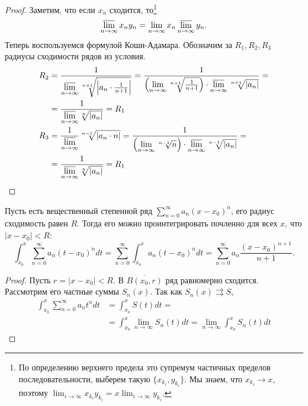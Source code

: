 \begin{proof}
	Заметим, что если $ x_{n}$ сходится, то\footnote{По определению верхнего предела это супремум частичных пределов последовательности, выберем такую $ \{x_{k_{i}}, y_{k_{i}}\}$. Мы знаем, что $ x_{k_{i}} \to x $, поэтому $ \lim_{i \to \infty} x_{k_{i}} y_{k _{i}} = x \lim_{i \to \infty} y_{k_i}$. }\[
    \varlimsup_{n \to  \infty} x_{n} y_{n} = \lim_{n \to \infty} x_{n} \varlimsup_{n \to \infty}y_{n}
    .\] 
	Теперь воспользуемся формулой Коши-Адамара. Обозначим за $ R_1, R_2, R_3$ радиусы сходимости рядов из условия.
	\[
	\begin{aligned}
		R_2 &= \frac{1}{\varlimsup\limits_{n \to \infty} 
				\sqrt[n+1]{\left| a_n \cdot \frac{1}{n+1} \right|} }
				= \frac{1}{\left( \lim\limits_{n\to \infty} \sqrt[n+1]{\frac{1}{n+1}}\right) \cdot \varlimsup\limits_{n\to \infty} \sqrt[n+1]{\lvert a_n \rvert }} =\\ 
			& = \frac{1}{ \varlimsup\limits_{n\to \infty} \sqrt[n]{\lvert a_{n} \rvert }} = R_1 \\
		R_3 & = \frac{1}{\varlimsup\limits_{n\to \infty}} \sqrt[n-1]{\left|a_n\cdot n\right|} 
				=\frac{1}{\left(\lim\limits_{n\to \infty} \sqrt[n-1]{n}\right)\cdot \varlimsup\limits_{n\to \infty} \sqrt[n-1]{\lvert a_n \rvert }} =\\
			& = \frac{1}{ \varlimsup\limits_{n\to \infty} \sqrt[n]{\lvert a_n \rvert }} = R_1
	\end{aligned}
	\]
\end{proof}

		\fontAwesomeSymbol{\faEmpire}

\begin{thm}
	Пусть есть вещественный степенной ряд $ \sum_{n=0}^{\infty} a_{n}(x - x_0)^{n}$, его радиус сходимость равен $ R$.
	Тогда его можно проинтегрировать почленно для всех $ x$, что $ \lvert x - x_0 \rvert < R$:
	\[
		\int_{x_0}^{x} \sum_{n=0}^{\infty} a_{n} (t - x_0) ^{n} dt = \sum_{n=0}^{\infty} \int_{x_0}^{x} a_n (t - x_0)^{n} dt = \sum_{n=0}^{\infty} a_{n} \frac{(x-x_0)^{n+1}}{n+1} 
	.\] 
\end{thm}
\begin{proof}
	Пусть $ r = \lvert x - x_0 \rvert <R$. В $ \overline{B(x_0, r)}$ ряд равномерно сходится.
	Рассмотрим его частные суммы $ S_n(x)$. Так как  $ S_{n} (x) \rightrightarrows S$,
	\[
		\begin{aligned}
			\int_{x_0}^{x} \sum_{n=0}^{\infty} a_{n} t ^{n} dt &= \int_{x_0}^{x} S(t) dt = \\
															   & = \int_{x_0}^{x} \lim_{n \to \infty} S_n(t) dt 
															    = \lim_{n \to \infty} \int_{x_0}^{x} S_{n} (t) dt 
		\end{aligned}
	\] 
\end{proof}

